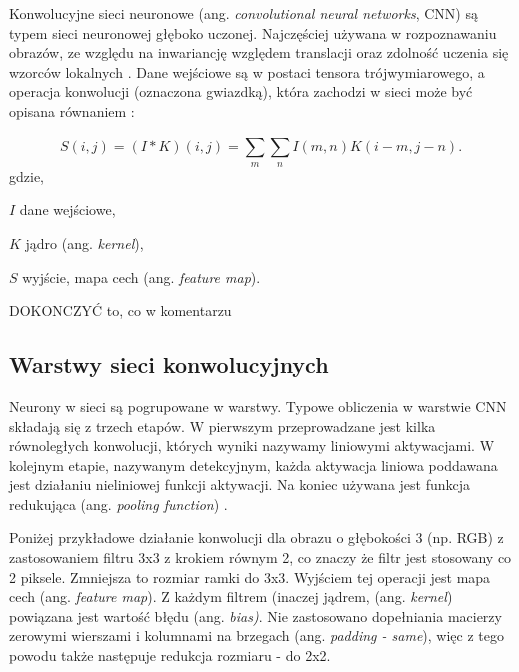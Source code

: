 Konwolucyjne sieci neuronowe (ang. \textit{convolutional neural networks}, CNN) są typem sieci neuronowej głęboko uczonej. Najczęściej używana w rozpoznawaniu obrazów, ze względu na inwariancję względem translacji oraz zdolność uczenia się wzorców lokalnych \cite{Chollet2017DeepLW}. Dane wejściowe są w postaci tensora trójwymiarowego, a operacja konwolucji (oznaczona gwiazdką), która zachodzi w sieci może być opisana równaniem \cite{deep_learning}:

\begin{equation}
S(i,j) = (I * K)(i,j) = \sum_{m}^{}\sum_{n}^{} I(m,n)K(i-m,j-n).
\end{equation}
gdzie,
\begin{eqwhere}[2cm]
	\item[$I$] dane wejściowe,
	\item[$K$] jądro (ang. \textit{kernel}),
	\item[$S$] wyjście, mapa cech (ang. \textit{feature map}).
\end{eqwhere}

DOKONCZYĆ to, co w komentarzu

\subsection{Warstwy sieci konwolucyjnych}
Neurony w sieci są pogrupowane w warstwy. Typowe obliczenia w warstwie CNN składają się z trzech etapów. W pierwszym przeprowadzane jest kilka równoległych konwolucji, których wyniki nazywamy liniowymi aktywacjami. W kolejnym etapie, nazywanym detekcyjnym, każda aktywacja liniowa poddawana jest działaniu nieliniowej funkcji aktywacji. Na koniec używana jest funkcja redukująca (ang. \textit{pooling function}) \cite{deep_learning}.

Poniżej przykładowe działanie konwolucji dla obrazu o głębokości 3 (np. RGB) z zastosowaniem filtru 3x3 z krokiem równym 2, co znaczy że filtr jest stosowany co 2 piksele. Zmniejsza to rozmiar ramki do 3x3. Wyjściem tej operacji jest mapa cech (ang. \textit{feature map}). Z każdym filtrem (inaczej jądrem, (ang. \textit{kernel}) powiązana jest wartość błędu (ang. \textit{bias)}. Nie zastosowano dopełniania macierzy zerowymi wierszami i kolumnami na brzegach (ang. \textit{padding - same}), więc z tego powodu także następuje redukcja rozmiaru - do 2x2. 

